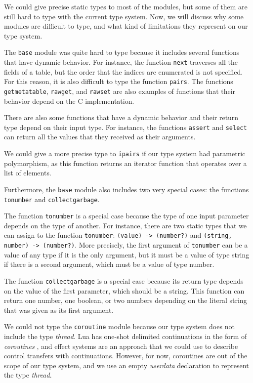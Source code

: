 We could give precise static types to most of the modules,
but some of them are still hard to type with the current type
system.
Now, we will discuss why some modules are difficult to type,
and what kind of limitations they represent on our type system.

The \texttt{base} module was quite hard to type because it
includes several functions that have dynamic behavior.
For instance, the function \texttt{next} traverses all the
fields of a table, but the order that the indices are
enumerated is not specified.
For this reason, it is also difficult to type the function
\texttt{pairs}.
The functions \texttt{getmetatable},  \texttt{rawget}, and
\texttt{rawset} are also examples of functions that their
behavior depend on the C implementation.

There are also some functions that have a dynamic behavior and
their return type depend on their input type.
For instance, the functions \texttt{assert} and \texttt{select}
can return all the values that they received as their arguments.

We could give a more precise type to \texttt{ipairs} if our
type system had parametric polymorphism, as this function
returns an iterator function that operates over a list of
elements.

Furthermore, the \texttt{base} module also includes two very
special cases: the functions \texttt{tonumber} and \texttt{collectgarbage}.

The function \texttt{tonumber} is a special case because the
type of one input parameter depends on the type of another.
For instance, there are two static types that we can
assign to the function \texttt{tonumber}:
\texttt{(value) -> (number?)} and
\texttt{(string, number) -> (number?)}.
More precisely, the first argument of \texttt{tonumber} can be
a value of any type if it is the only argument, but it must
be a value of type string if there is a second argument,
which must be a value of type number.

The function \texttt{collectgarbage} is a special case because
its return type depends on the value of the first parameter,
which should be a string.
This function can return one number, one boolean, or two numbers
depending on the literal string that was given as its first argument.

We could not type the \texttt{coroutine} module because our
type system does not include the type \emph{thread}.
Lua has one-shot delimited continuations \citep{james2011yield}
in the form of \emph{coroutines} \citep{moura2009rc}, and
effect systems \citep{nielson1999type} are an approach that we
could use to describe control transfers with continuations.
However, for now, coroutines are out of the scope of our type
system, and we use an empty \emph{userdata} declaration
to represent the type \emph{thread}.

